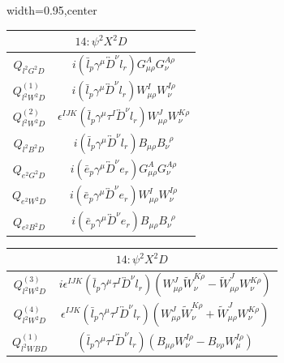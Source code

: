 \begin{table}[H]
\begin{center}
\begin{adjustbox}{width=0.95\textwidth,center}
\small
\begin{minipage}[t]{5.9cm}
\renewcommand{\arraystretch}{1.5}
\begin{tabular}[t]{c|c}
\multicolumn{2}{c}{\boldmath$14:\psi^2X^2D$} \\
\hline
$Q_{l^2G^2D}$  &  $i (\bar l_p \gamma^\mu \overleftrightarrow{D}^\nu l_r) G_{\mu\rho}^A G_\nu^{A\rho}$ \\
%
$Q_{l^2W^2D}^{(1)}$  &  $i (\bar l_p \gamma^\mu \overleftrightarrow{D}^\nu l_r) W_{\mu\rho}^I W_{\nu}^{I\rho}$ \\
%
$Q_{l^2W^2D}^{(2)}$  &  $\epsilon^{IJK} (\bar l_p \gamma^\mu \tau^I \overleftrightarrow{D}^\nu l_r) W_{\mu\rho}^J W_{\nu}^{K\rho}$ \\
%
$Q_{l^2B^2D}$  &  $i (\bar l_p \gamma^\mu \overleftrightarrow{D}^\nu l_r) B_{\mu\rho} B_\nu^{\,\,\,\rho}$ \\
%
$Q_{e^2G^2D}$  &  $i (\bar e_p \gamma^\mu \overleftrightarrow{D}^\nu e_r) G_{\mu\rho}^A G_\nu^{A\rho}$ \\
%
$Q_{e^2W^2D}$  &  $i (\bar e_p \gamma^\mu \overleftrightarrow{D}^\nu e_r) W_{\mu\rho}^I W_{\nu}^{I\rho}$ \\
%
$Q_{e^2B^2D}$  &  $i (\bar e_p \gamma^\mu \overleftrightarrow{D}^\nu e_r) B_{\mu\rho} B_\nu^{\,\,\,\rho}$
\end{tabular}
\end{minipage}
\hspace{1cm}
\begin{minipage}[t]{7.4cm}
\renewcommand{\arraystretch}{1.5}
\begin{tabular}[t]{c|c}
\multicolumn{2}{c}{\boldmath$14:\psi^2X^2D$} \\
\hline
$Q_{l^2W^2D}^{(3)}$  &  $i \epsilon^{IJK} (\bar l_p \gamma^\mu \tau^I \overleftrightarrow{D}^\nu l_r) (W_{\mu\rho}^J \widetilde{W}_{\nu}^{K\rho} - \widetilde{W}_{\mu\rho}^J W_{\nu}^{K\rho})$ \\
%
$Q_{l^2W^2D}^{(4)}$  &  $\epsilon^{IJK} (\bar l_p \gamma^\mu \tau^I \overleftrightarrow{D}^\nu l_r) (W_{\mu\rho}^J \widetilde{W}_{\nu}^{K\rho} + \widetilde{W}_{\mu\rho}^J W_{\nu}^{K\rho})$ \\
%
$Q_{l^2WBD}^{(1)}$  &  $(\bar l_p \gamma^\mu \tau^I \overleftrightarrow{D}^\nu l_r) (B_{\mu\rho} W_{\nu}^{I\rho} - B_{\nu\rho} W_{\mu}^{I\rho})$ \\

\end{tabular}
\end{minipage}
\end{adjustbox}
\end{center}
\end{table}
